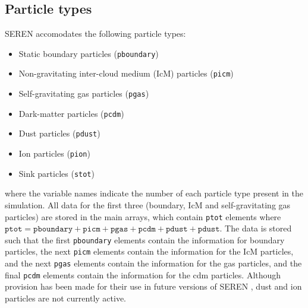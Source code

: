 \documentclass[a4paper]{article}
\newcommand{\NAME}{SEREN }
\newcommand{\var}[1]{\texttt{#1}}
\begin{document}
\subsection{Particle types}
\NAME accomodates the following particle types: 
\begin{itemize}
\item Static boundary particles (\var{pboundary})
\item Non-gravitating inter-cloud medium (IcM) particles (\var{picm})
\item Self-gravitating gas particles (\var{pgas})
\item Dark-matter particles (\var{pcdm})
\item Dust particles (\var{pdust})
\item Ion particles (\var{pion})
\item Sink particles (\var{stot})
\end{itemize}
where the variable names indicate the number of each particle type present 
in the simulation.  All data for the first three (boundary, IcM and self-gravitating gas particles) are stored in the main arrays, which contain \var{ptot} elements where $\var{ptot} = \var{pboundary} + \var{picm} + \var{pgas} + \var{pcdm} + \var{pdust} + \var{pdust}$.   
The data is stored such that the first \var{pboundary} elements contain the 
information for boundary particles, the next \var{picm} elements contain the 
information for the IcM particles, and the next \var{pgas} elements 
contain the information for the gas particles, and the final \var{pcdm} elements contain the information for the cdm particles.  Although provision has been made for their use in future versions of \NAME, dust and ion particles are not currently active.  
\end{document}
